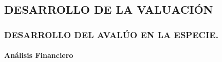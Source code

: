 \documentclass[10pt,letter]{report}
\begin{document}
\begin{enumerate}[a.]
\renewcommand\thefigure{\arabic{figure}} 

%

\espacio{4cm}

%



%

%

%

%

%


%

%

%



%


\chapter{DESARROLLO DE LA VALUACI\'ON}\label{cap:5}
\thispagestyle{fancy}

\setcounter{section}{11}

\subsection{DESARROLLO DEL AVAL\'UO EN LA ESPECIE.}\label{sec:k2}

\subsubsection{An\'alisis Financiero}
%


\end{enumerate}
\end{document}
